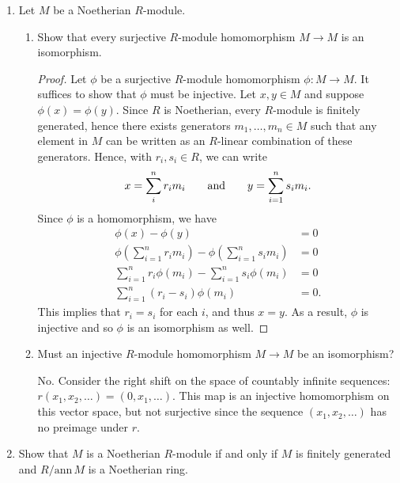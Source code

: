 \documentclass[11pt,oneside,english]{amsart}
\theoremstyle{definition}
\newcommand{\aspace}{\hspace{7mm}\text{and}\hspace{7mm}}
\newcommand{\lspace}{\vspace{5mm}}
\begin{document}
\rightline{\today}

\lspace




\begin{enumerate}[leftmargin=*]
\itemsep5mm

\item Let $M$ be a Noetherian $R$-module.
\begin{enumerate}
\item Show that every surjective $R$-module homomorphism $M\to M$ is an isomorphism.
\begin{proof}
Let $\phi$ be a surjective $R$-module homomorphism $\phi: M\to M$. It suffices to show that $\phi$ must be injective. Let $x,y\in M$ and suppose $\phi(x)=\phi(y)$. Since $R$ is Noetherian, every $R$-module is finitely generated, hence there exists generators $m_1,\ldots,m_n\in M$ such that any element in $M$ can be written as an $R$-linear combination of these generators. Hence, with $r_i,s_i\in R$, we can write
\[
x=\sum_{i}^nr_im_i \aspace y=\sum_{i=1}^ns_im_i. 
\]
Since $\phi$ is a homomorphism, we have
\begin{align*}
\phi(x)-\phi(y)&=0\\[2mm]
\phi\left(\sum_{i=1}^nr_im_i\right)-\phi\left(\sum_{i=1}^ns_im_i\right)&=0\\[2mm]
\sum_{i=1}^nr_i\phi(m_i)-\sum_{i=1}^ns_i\phi(m_i)&=0\\[2mm]
\sum_{i=1}^n(r_i-s_i)\phi(m_i)&=0.
\end{align*}
This implies that $r_i=s_i$ for each $i$, and thus $x=y$. As a result, $\phi$ is injective and so $\phi$ is an isomorphism as well.
\end{proof}

\item Must an injective $R$-module homomorphism $M\to M$ be an isomorphism?

No. Consider the right shift on the space of countably infinite sequences: $r(x_1,x_2,\ldots)=(0,x_1,\ldots)$. This map is an injective homomorphism on this vector space, but not surjective since the sequence $(x_1,x_2,\ldots)$ has no preimage under $r$.
\end{enumerate}

\pagebreak
\item Show that $M$ is a Noetherian $R$-module if and only if $M$ is finitely generated and $R/\text{ann}\,M$ is a Noetherian ring. 


\end{enumerate}
\end{document}
